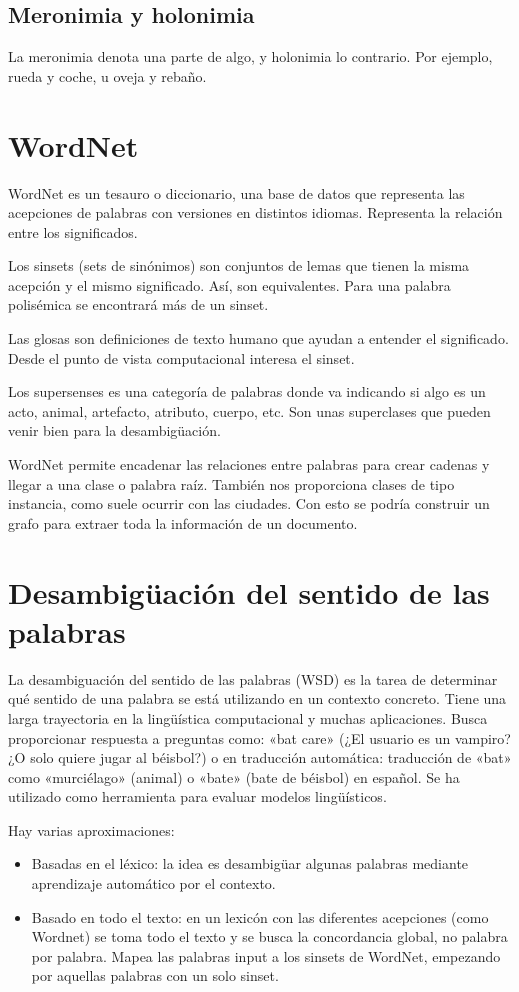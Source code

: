 \subsection{Meronimia y holonimia}
La meronimia denota una parte de algo, y holonimia lo contrario. Por ejemplo, rueda y coche, u oveja y rebaño.

\section{WordNet}

WordNet es un tesauro o diccionario, una base de datos que representa las acepciones de palabras con versiones en distintos idiomas. Representa la relación entre los significados. 

Los sinsets (sets de sinónimos) son conjuntos de lemas que tienen la misma acepción y el mismo significado. Así, son equivalentes. Para una palabra polisémica se encontrará más de un sinset.

Las glosas son definiciones de texto humano que ayudan a entender el significado. Desde el punto de vista computacional interesa el sinset.

Los supersenses es una categoría de palabras  donde va indicando si algo es un acto, animal, artefacto, atributo, cuerpo, etc. Son unas superclases que pueden venir bien para la desambigüación.

WordNet permite encadenar las relaciones entre palabras para crear cadenas y llegar a una clase o palabra raíz. También nos proporciona clases de tipo instancia, como suele ocurrir con las ciudades. Con esto se podría construir un grafo para extraer toda la información de un documento. 

\section{Desambigüación del sentido de las palabras}
La desambiguación del sentido de las palabras (WSD) es la tarea de determinar qué sentido de una palabra se está utilizando en un contexto concreto. Tiene una larga trayectoria en la lingüística computacional y muchas aplicaciones. Busca proporcionar respuesta a preguntas como: «bat care» (¿El usuario es un vampiro? ¿O solo quiere jugar al béisbol?) o en traducción automática: traducción de «bat» como «murciélago» (animal) o «bate» (bate de béisbol) en español. Se ha utilizado como herramienta para evaluar modelos lingüísticos.

Hay varias aproximaciones:
\begin{itemize}
\item Basadas en el léxico: la idea es desambigüar algunas palabras mediante aprendizaje automático por el contexto.
\item Basado en todo el texto: en un lexicón con las diferentes acepciones (como Wordnet) se toma todo el texto y se busca la concordancia global, no palabra por palabra. Mapea las palabras input a los sinsets de WordNet, empezando por aquellas palabras con un solo sinset.
\end{itemize}

